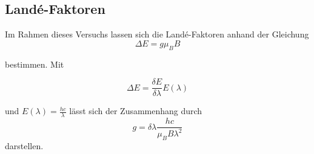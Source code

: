 \subsection{Landé-Faktoren}

Im Rahmen dieses Versuchs lassen sich die Landé-Faktoren anhand der Gleichung 
\begin{equation}
    \Delta E = g\mu_B B 
\end{equation} 

bestimmen. Mit

\begin{equation}
    \Delta E = \frac{\delta E}{\delta\lambda}E(\lambda)
\end{equation}

und $E(\lambda) = \frac{hc}{\lambda}$ lässt sich der Zusammenhang durch 
\begin{equation*}
    g = \delta\lambda\frac{hc}{\mu_B B \lambda^2}
    \label{eqn:lande}
\end{equation*} darstellen. 